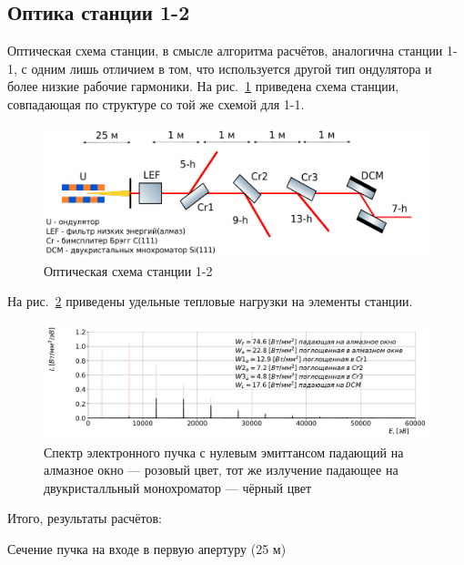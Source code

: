 \subsection{Оптика станции 1-2}
Оптическая схема станции, в смысле алгоритма расчётов, аналогична станции 1-1, с одним лишь отличием в том, что используется другой тип ондулятора и более низкие рабочие гармоники. На рис.~\ref{fig:OptScheme_1-2} приведена схема станции, совпадающая по структуре со той же схемой для 1-1. 
\begin{figure}[h!]
	\centering  
	\includegraphics[width=\textwidth]{pic/OptScheme_1-2.pdf}
	\caption{Оптическая схема станции 1-2}
	\label{fig:OptScheme_1-2}  
\end{figure}
На рис.~\ref{fig:full_spec_1-2} приведены удельные тепловые нагрузки на элементы станции. 
\begin{figure}[h!]
	\centering
	\includegraphics[width=\textwidth]{pic/full_spec_1-2.pdf}
	\caption{Спектр электронного пучка с нулевым эмиттансом падающий на алмазное окно --- розовый цвет, тот же излучение падающее на двукристалльный монохроматор --- чёрный цвет}
	\label{fig:full_spec_1-2}   
\end{figure}

Итого, результаты расчётов: 
\begin{table}[h!]
	\caption{Сечение пучка на входе в первую апертуру (25 м)}
	\renewcommand*\dtlrealalign{S}
	\centering
	\label{table:size_obeam}
\end{table}

